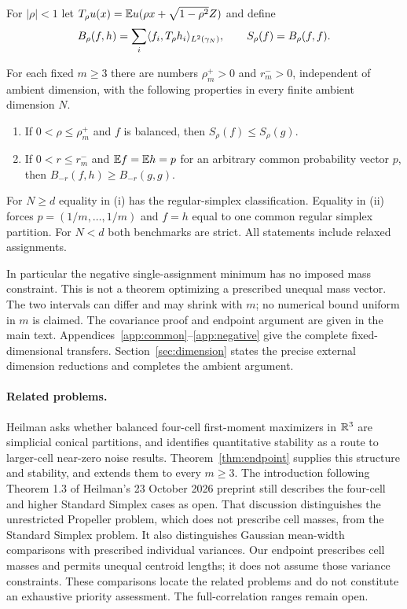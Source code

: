 For $|\rho|<1$ let
$T_\rho u(x)=\mathbb E u(\rho x+\sqrt{1-\rho^2}Z)$ and define
\[
 B_\rho(f,h)=\sum_i\langle f_i,T_\rho h_i\rangle_{L^2(\gamma_N)},
 \qquad S_\rho(f)=B_\rho(f,f).
\]

\begin{theorem}\label{thm:noise}
For each fixed $m\geq3$ there are numbers $\rho_m^+>0$ and $r_m^->0$,
independent of ambient dimension, with the following properties in every
finite ambient dimension $N$.
\begin{enumerate}[label=(\roman*)]
\item If $0<\rho\leq\rho_m^+$ and $f$ is balanced, then
$S_\rho(f)\leq S_\rho(g)$.
\item If $0<r\leq r_m^-$ and $\mathbb E f=\mathbb E h=p$ for an arbitrary common
probability vector $p$, then $B_{-r}(f,h)\geq B_{-r}(g,g)$.
\end{enumerate}
For $N\geq d$ equality in (i) has the regular-simplex classification.
Equality in (ii) forces $p=(1/m,\ldots,1/m)$ and $f=h$ equal to one common
regular simplex partition. For $N<d$ both benchmarks are strict.
All statements include relaxed assignments.
\end{theorem}

In particular the negative single-assignment minimum has no imposed mass
constraint. This is not a theorem optimizing a prescribed unequal mass vector.
The two intervals can differ and may shrink with $m$; no numerical bound
uniform in $m$ is claimed. The covariance proof and endpoint argument are
given in the main text. Appendices~\ref{app:common}--\ref{app:negative} give
the complete fixed-dimensional transfers. Section~\ref{sec:dimension} states
the precise external dimension reductions and completes the ambient argument.

\paragraph{Related problems.}
Heilman \cite[Section 8, Conjecture 3]{H2014} asks whether balanced
four-cell first-moment maximizers in $\mathbb R^3$ are simplicial conical partitions,
and identifies quantitative stability as a route to larger-cell
near-zero noise results. Theorem~\ref{thm:endpoint} supplies this structure
and stability, and extends them to every $m\geq3$.
The introduction following Theorem 1.3 of Heilman's 23 October 2026
preprint \cite{H2026} still describes the four-cell and higher
Standard Simplex cases as open. That discussion distinguishes the
unrestricted Propeller problem, which does not prescribe cell masses,
from the Standard Simplex problem. It also distinguishes Gaussian
mean-width comparisons with prescribed individual variances.
Our endpoint prescribes cell masses and permits unequal centroid lengths;
it does not assume those variance constraints.
These comparisons locate the related problems and do not constitute an
exhaustive priority assessment. The full-correlation ranges remain open.

